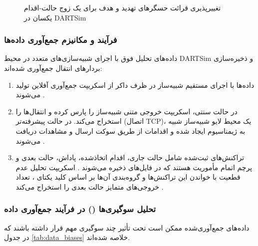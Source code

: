 \documentclass[oneside,openany,a4paper,12pt,draft]{article}
\begin{document}
\clearpage

\begin{figure}[H]
  \centering
  \caption{تغییرپذیری قرائت حسگرهای تهدید و هدف برای یک زوج حالت-اقدام یکسان در DARTSim}
  \label{fig:dartsim_sensor_uncertainty}
\end{figure}

\clearpage

\subsubsection{فرآیند و مکانیزم جمع‌آوری داده‌ها}
داده‌های تحلیل فوق با اجرای شبیه‌سازی‌های متعدد در محیط DARTSim و ذخیره‌سازی بردارهای انتقال جمع‌آوری شده‌اند:
\begin{enumerate}
    \item داده‌ها با اجرای مستقیم شبیه‌ساز در ظرف داکر از اسکریپت جمع‌آوری آفلاین تولید می‌شوند .
    \item در حالت سنتی، اسکریپت خروجی متنی شبیه‌ساز را پارس کرده و انتقال‌ها را استخراج می‌کند. در حالت پیشرفته‌تر (اتصال TCP)، یک محیط لایو شبیه‌ساز شبیه به ژیمناسیوم  ایجاد شده و اقدامات از طریق سوکت ارسال و مشاهدات دریافت می‌شوند .
    \item تراکنش‌های ثبت‌شده شامل حالت جاری، اقدام اتخاذشده، پاداش، حالت بعدی و پرچم اتمام مأموریت هستند که در فایل‌های  ذخیره می‌شوند . اسکریپت تحلیل عدم قطعیت با خواندن این تراکنش‌ها و گروه‌بندی آن‌ها بر اساس کلید یکتای ، تعداد خروجی‌های متمایز حالت بعدی را استخراج می‌کند .
\end{enumerate}

\subsubsection{تحلیل سوگیری‌ها () در فرآیند جمع‌آوری داده}
داده‌های جمع‌آوری‌شده ممکن است تحت تأثیر چند سوگیری مهم قرار داشته باشند که در جدول \ref{tab:data_biases} خلاصه شده‌اند.
\end{document}
